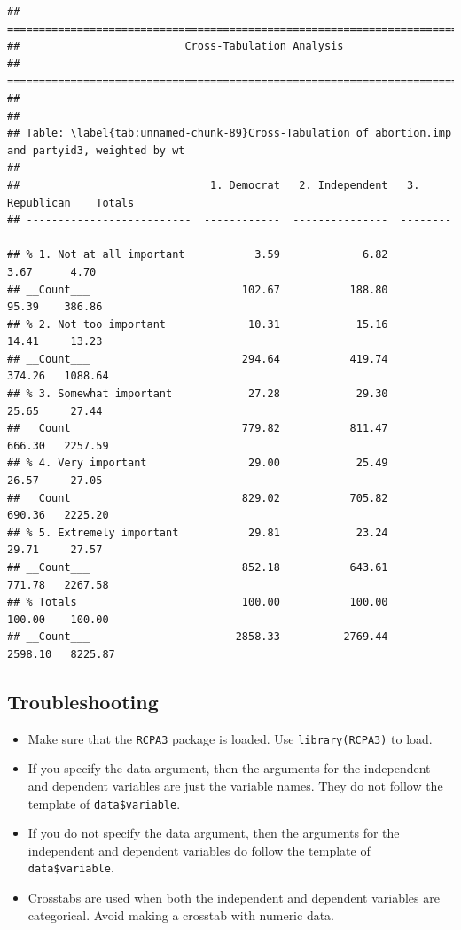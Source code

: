 \documentclass[
]{book}
\providecommand{\tightlist}{%
  \setlength{\itemsep}{0pt}\setlength{\parskip}{0pt}}
\begin{document}
\begin{verbatim}
## ===========================================================================
##                          Cross-Tabulation Analysis
## ===========================================================================
## 
## 
## Table: \label{tab:unnamed-chunk-89}Cross-Tabulation of abortion.imp and partyid3, weighted by wt
## 
##                              1. Democrat   2. Independent   3. Republican    Totals
## --------------------------  ------------  ---------------  --------------  --------
## % 1. Not at all important           3.59             6.82            3.67      4.70
## __Count___                        102.67           188.80           95.39    386.86
## % 2. Not too important             10.31            15.16           14.41     13.23
## __Count___                        294.64           419.74          374.26   1088.64
## % 3. Somewhat important            27.28            29.30           25.65     27.44
## __Count___                        779.82           811.47          666.30   2257.59
## % 4. Very important                29.00            25.49           26.57     27.05
## __Count___                        829.02           705.82          690.36   2225.20
## % 5. Extremely important           29.81            23.24           29.71     27.57
## __Count___                        852.18           643.61          771.78   2267.58
## % Totals                          100.00           100.00          100.00    100.00
## __Count___                       2858.33          2769.44         2598.10   8225.87
\end{verbatim}

\hypertarget{troubleshooting-34}{%
\subsection{Troubleshooting}\label{troubleshooting-34}}

\begin{itemize}
\tightlist
\item
  Make sure that the \texttt{RCPA3} package is loaded. Use \texttt{library(RCPA3)} to load.
\item
  If you specify the data argument, then the arguments for the independent and dependent variables are just the variable names. They do not follow the template of \texttt{data\$variable}.
\item
  If you do not specify the data argument, then the arguments for the independent and dependent variables do follow the template of \texttt{data\$variable}.
\item
  Crosstabs are used when both the independent and dependent variables are categorical. Avoid making a crosstab with numeric data.
\end{itemize}
\end{document}
